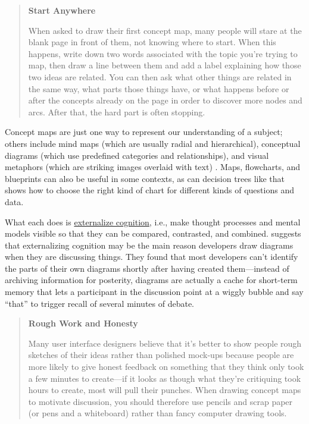 \begin{quote}\setlength{\parindent}{0pt}
\textbf{Start Anywhere}

When asked to draw their first concept map, many people will stare at
the blank page in front of them, not knowing where to start. When this
happens, write down two words associated with the topic you're trying
to map, then draw a line between them and add a label explaining how
those two ideas are related. You can then ask what other things are
related in the same way, what parts those things have, or what happens
before or after the concepts already on the page in order to discover
more nodes and arcs. After that, the hard part is often stopping.
\end{quote}

Concept maps are just one way to represent our understanding of a
subject; others include mind maps (which are usually radial and
hierarchical), conceptual diagrams (which use predefined categories and
relationships), and visual metaphors (which are striking images overlaid
with text) \cite{Eppl2006}. Maps, flowcharts, and blueprints can also
be useful in some contexts, as can decision trees like
\cite{Abel2009} that shows how to choose the right kind of chart for
different kinds of questions and data.

What each does is \protect\hyperlink{g:externalized-cognition}{externalize cognition},
i.e., make thought processes and mental models visible so that they
can be compared, contrasted, and combined. \cite{Cher2007}
suggests that externalizing cognition may be the main reason
developers draw diagrams when they are discussing things. They found
that most developers can't identify the parts of their own diagrams
shortly after having created them---instead of archiving information
for posterity, diagrams are actually a cache for short-term memory
that lets a participant in the discussion point at a wiggly bubble and
say ``that'' to trigger recall of several minutes of debate.

\begin{quote}\setlength{\parindent}{0pt}
\textbf{Rough Work and Honesty}

Many user interface designers believe that it's better to show people
rough sketches of their ideas rather than polished mock-ups because
people are more likely to give honest feedback on something that they
think only took a few minutes to create---if it looks as though what
they're critiquing took hours to create, most will pull their punches.
When drawing concept maps to motivate discussion, you should therefore
use pencils and scrap paper (or pens and a whiteboard) rather than
fancy computer drawing tools.
\end{quote}

